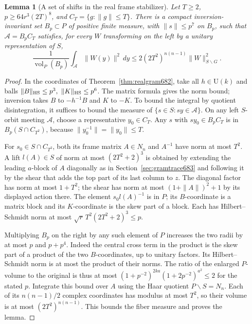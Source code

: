 \documentclass[a4paper,11pt]{article}
\newtheorem{lemma}[proposition]{Lemma}
\theoremstyle{definition}
\theoremstyle{remark}
\numberwithin{equation}{section}
\begin{document}
\begin{lemma}[A set of shifts in the real frame stabilizer]
\leavevmode\label{lem:shifts685}
Let \(T\ge2\), \(p\ge64r^3(2T)^8\), and \(C_T=\{g:\|g\|\le T\}\).
There is a compact inversion-invariant set \(B_p\subset P\) of
positive finite measure, with \(\|s\|\le p^7\) on \(B_p\), such
that \(\mathcal A=B_p C_T\) satisfies, for every \(W\) transforming
on the left by a unitary representation of \(S\),
\[
 \frac1{\operatorname{vol}_P(B_p)}\int_{\mathcal A}\|W(y)\|^2\,dy
          \le 2(2T^2)^{n(n-1)}\|W\|_{S\backslash G}^2 .
\]
\end{lemma}
\begin{proof}
In the coordinates of Theorem~\ref{thm:realgram682}, take all
\(h\in\mathrm U(k)\) and balls
\(\|B\|_{\rm HS}\le p^3,\ \|K\|_{\rm HS}\le p^6\).
The matrix formula gives the norm bound; inversion takes
\(B\) to \(-h^{-1}B\) and \(K\) to \(-K\). To bound the integral
by quotient disintegration, it suffices to bound the measure of
\(\{s\in S:sy\in\mathcal A\}\). On any left \(S\)-orbit meeting
\(\mathcal A\), choose a representative \(y_0\in C_T\).
Any \(s\) with \(sy_0\in B_pC_T\) is in
\(B_p(S\cap C_{T^2})\), because
\(\|y_0^{-1}\|=\|y_0\|\le T\).

For \(s_0\in S\cap C_{T^2}\), both its frame matrix \(A\in N_n\)
and \(A^{-1}\) have norm at most \(T^2\). A lift \(l(A)\in S\)
of norm at most \((2T^2+2)^3\) is obtained by extending
the leading \(a\)-block of \(A\) diagonally as in
Section~\ref{sec:gramtrace683} and following it by the shear
that adds the top part of its last column to \(z\). The diagonal
factor has norm at most \(1+T^2\); the shear has norm at most
\((1+\|A\|)^2+1\) by its displayed action there. The element
\(s_0 l(A)^{-1}\) is in \(P\); its \(B\)-coordinate is a matrix
block and its \(K\)-coordinate is the skew part of a block.
Each has Hilbert--Schmidt norm at most
\(\sqrt r\,T^2(2T^2+2)^3\le p\).

Multiplying \(B_p\) on the right by any such element of \(P\)
increases the two radii by at most \(p\) and \(p+p^4\).
Indeed the central cross term in the product is the skew
part of a product of the two \(B\)-coordinates, up to unitary
factors. Its Hilbert--Schmidt norm is at most the product of
their norms. The ratio of the enlarged \(P\)-volume to the
original is thus at most
\((1+p^{-2})^{2ka}(1+2p^{-2})^{a^2}\le2\) for the stated
\(p\). Integrate this bound over \(A\) using the Haar quotient
\(P\backslash S=N_n\). Each of its \(n(n-1)/2\) complex
coordinates has modulus at most \(T^2\), so their volume is
at most \((2T^2)^{n(n-1)}\). This bounds the fiber measure
and proves the lemma.
\end{proof}
\end{document}
